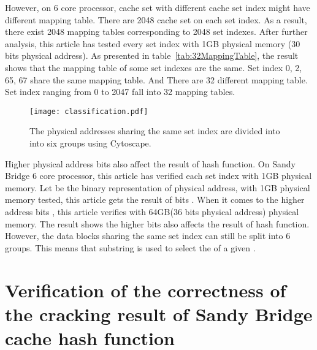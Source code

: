 \documentclass[conference]{IEEEtran}
\newcommand{\SandyBridge}{Sandy Bridge }
\begin{document}
However, on 6 core processor, cache set with different cache set index might have different mapping table. There are 2048 cache set on each set index. As a result, there exist 2048 mapping tables corresponding to 2048 set indexes. After further analysis, this article has tested every set index with 1GB physical memory (30 bits physical address). As presented in table~\ref{tab:32MappingTable}, the result shows that the mapping table of some set indexes are the same. Set index 0, 2, 65, 67 share the same mapping table. And There are 32 different mapping table. Set index ranging from 0 to 2047 fall into 32 mapping tables.
\begin{figure}[!htp]
\centering
\texttt{[image: classification.pdf]}
\caption{The physical addresses sharing the same set index are divided into into six groups using Cytoscape.}
\label{fig:classification}
\end{figure}

Higher physical address bits also affect the result of hash function. On Sandy Bridge 6 core processor, this article has verified each set index with 1GB physical memory. Let  be the binary representation of physical address, with 1GB physical memory tested, this article gets the result of bits . When it comes to the higher address bits , this article verifies with 64GB(36 bits physical address) physical memory. The result shows the higher bits also affects the result of hash function. However, the data blocks sharing the same set index can still be split into 6 groups. This means that substring  is used to select the  of a given .
\section{Verification of the correctness of the cracking result of \SandyBridge cache hash function}
\end{document}
